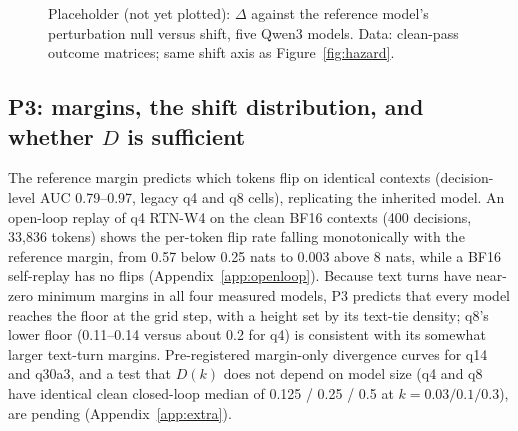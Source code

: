 \begin{figure}[t]
\centering
{}
\caption{Placeholder (not yet plotted): $\Delta$ against the reference model's perturbation null versus shift, five Qwen3 models. Data: clean-pass outcome matrices; same shift axis as Figure~\ref{fig:hazard}.}
\label{fig:delta}
\end{figure}

\subsection{P3: margins, the shift distribution, and whether $D$ is sufficient}
\label{sec:p3}

The reference margin predicts which tokens flip on identical contexts (decision-level AUC 0.79--0.97, legacy q4 and q8 cells), replicating the inherited model. An open-loop replay of q4 RTN-W4 on the clean BF16 contexts (400 decisions, 33,836 tokens) shows the per-token flip rate falling monotonically with the reference margin, from 0.57 below 0.25 nats to 0.003 above 8 nats, while a BF16 self-replay has no flips (Appendix~\ref{app:openloop}). Because text turns have near-zero minimum margins in all four measured models, P3 predicts that every model reaches the floor at the grid step, with a height set by its text-tie density; q8's lower floor (0.11--0.14 versus about 0.2 for q4) is consistent with its somewhat larger text-turn margins. Pre-registered margin-only divergence curves for q14 and q30a3, and a test that $D(k)$ does not depend on model size (q4 and q8 have identical clean closed-loop median \absd{} of 0.125 / 0.25 / 0.5 at $k = 0.03 / 0.1 / 0.3$), are pending (Appendix~\ref{app:extra}).

